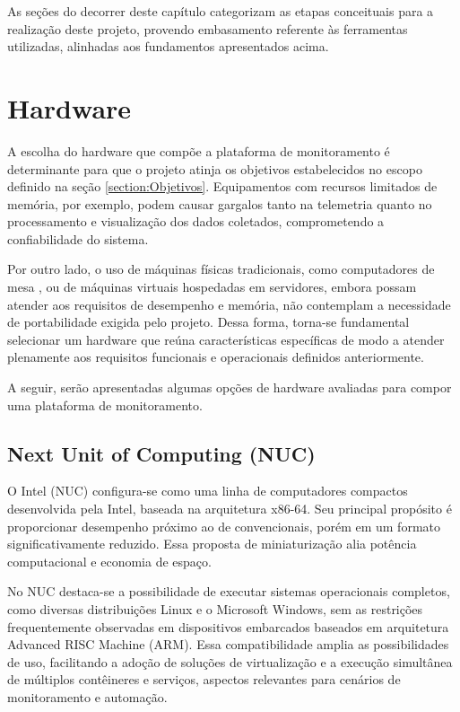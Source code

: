 As seções do decorrer deste capítulo categorizam as etapas conceituais para a realização deste projeto, provendo embasamento referente às ferramentas utilizadas, alinhadas aos fundamentos apresentados acima.


\section{Hardware}
\label{section:Hardware}

A escolha do hardware que compõe a plataforma de monitoramento é determinante para que o projeto atinja os objetivos estabelecidos no escopo definido na seção \ref{section:Objetivos}. Equipamentos com recursos limitados de memória, por exemplo, podem causar gargalos tanto na telemetria quanto no processamento e visualização dos dados coletados, comprometendo a confiabilidade do sistema.

Por outro lado, o uso de máquinas físicas tradicionais, como computadores de mesa , ou de máquinas virtuais hospedadas em servidores, embora possam atender aos requisitos de desempenho e memória, não contemplam a necessidade de portabilidade exigida pelo projeto. Dessa forma, torna-se fundamental selecionar um hardware que reúna características específicas de modo a atender plenamente aos requisitos funcionais e operacionais definidos anteriormente.

A seguir, serão apresentadas algumas opções de hardware avaliadas para compor uma plataforma de monitoramento.

\subsection{Next Unit of Computing (NUC)}
\label{subsection:NUC}

O Intel  (NUC) \citep{nuc2025} configura-se como uma linha de computadores compactos desenvolvida pela Intel, baseada na arquitetura x86-64. Seu principal propósito é proporcionar desempenho próximo ao de  convencionais, porém em um formato significativamente reduzido. Essa proposta de miniaturização alia potência computacional e economia de espaço.

No NUC destaca-se a possibilidade de executar sistemas operacionais completos, como diversas distribuições Linux e o Microsoft Windows, sem as restrições frequentemente observadas em dispositivos embarcados baseados em arquitetura Advanced RISC Machine (ARM). Essa compatibilidade amplia as possibilidades de uso, facilitando a adoção de soluções de virtualização e a execução simultânea de múltiplos contêineres e serviços, aspectos relevantes para cenários de monitoramento e automação.

